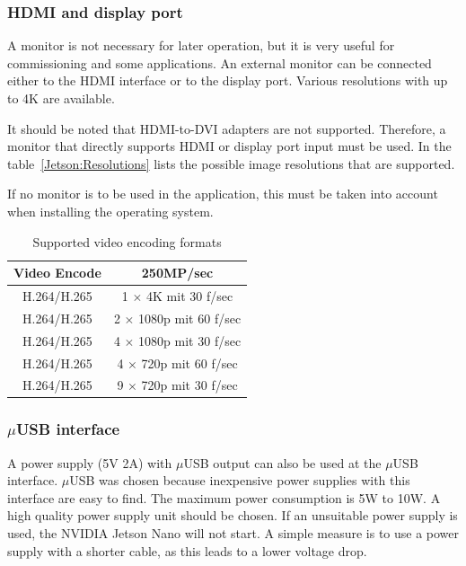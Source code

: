 \subsubsection{HDMI and display port}

A monitor is not necessary for later operation, but it is very useful for commissioning and some applications. An external monitor can be connected either to the HDMI interface or to the display port. Various resolutions with up to 4K are available.

It should be noted that HDMI-to-DVI adapters are not supported. Therefore, a monitor that directly supports HDMI or display port input must be used. In the table~\ref{Jetson:Resolutions}
lists the possible image resolutions that are supported.

If no monitor is to be used in the application, this must be taken into account when installing the operating system.



\begin{table}
  \centering
  \begin{tabular}{cc}
    \textbf{Video Encode}  & \textbf{250MP/sec} \\   \hline
     H.264/H.265           & 1 $\times$  4K mit  30 f/sec \\
     H.264/H.265	       & 2 $\times$ 1080p mit 60 f/sec \\
     H.264/H.265	       & 4 $\times$ 1080p mit 30 f/sec \\
     H.264/H.265	       & 4 $\times$ 720p mit 60 f/sec  \\
     H.264/H.265	       & 9 $\times$ 720p mit 30 f/sec \\
  \end{tabular}
 \caption{Supported video encoding formats}\label{Jetson:Aufloesungen}
\end{table}



\subsubsection{$\mu$USB interface}


A power supply (5V\textdirectcurrent{} 2A) with $\mu$USB output can also be used at the $\mu$USB interface. $\mu$USB was chosen because inexpensive power supplies with this interface are easy to find. The maximum power consumption is 5W to 10W. A high quality power supply unit should be chosen. If an unsuitable power supply is used, the NVIDIA Jetson Nano will not start. A simple measure is to use a power supply with a shorter cable, as this leads to a lower voltage drop.



